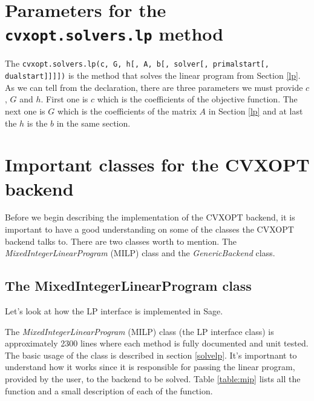 \section{Parameters for the \texttt{cvxopt.solvers.lp} method}
\label{lppara}
The \texttt{cvxopt.solvers.lp(c, G, h[, A, b[, solver[, primalstart[, dualstart]]]])} is the method that solves the linear program from Section \ref{lp}. As we can tell from the declaration, there are three parameters we must provide $c$, $G$ and $h$.
First one is $c$ which is the coefficients of the objective function. The next one is $G$ which is the coefficients of the matrix $A$ in Section \ref{lp} and at last the $h$ is the $b$ in the same section.

\section{Important classes for the CVXOPT backend}
 Before we begin describing the implementation of the CVXOPT backend, it is important to have a good understanding on some of the classes the CVXOPT backend talks to. There are two classes worth to mention. The \textit{MixedIntegerLinearProgram} (MILP) class and the \textit{GenericBackend} class.
 
 
 \subsection{The MixedIntegerLinearProgram class}
Let's look at how the LP interface is implemented in Sage. 
 
 
The  \textit{MixedIntegerLinearProgram} (MILP) class (the LP interface class) is approximately 2300 lines where each method is fully documented and unit tested. The basic usage of the class is described in section \ref{solvelp}. It's importnant to understand how it works since it is responsible for passing the linear program, provided by the user, to the backend to be solved.   Table \ref{table:mip} lists all the function and a small description of each of the function.

